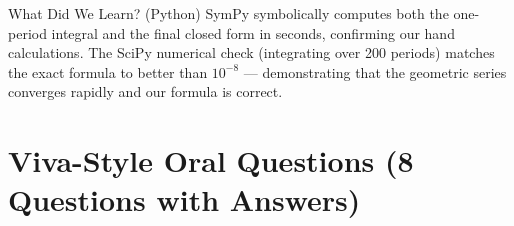 \documentclass[12pt,a4paper]{article}
\begin{document}
\begin{learnbox}{What Did We Learn? (Python)}
SymPy symbolically computes both the one-period integral and the final closed
form in seconds, confirming our hand calculations. The SciPy numerical check
(integrating over 200 periods) matches the exact formula to better than
$10^{-8}$ --- demonstrating that the geometric series converges rapidly and
our formula is correct.
\end{learnbox}

\section{Viva-Style Oral Questions (8 Questions with Answers)}
\end{document}
